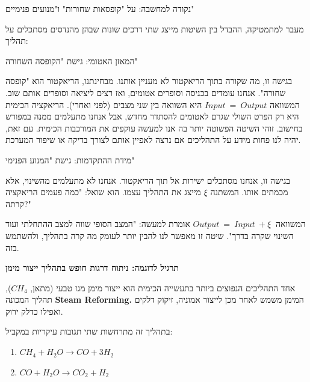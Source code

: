 \documentclass[
  hebrew,
  letterpaper,
  DIV=11,
  numbers=noendperiod]{scrreprt}
\begin{document}
\begin{tcolorbox}[enhanced jigsaw, colback=white, arc=.35mm, coltitle=black, breakable, toptitle=1mm, leftrule=.75mm, colbacktitle=quarto-callout-tip-color!10!white, opacitybacktitle=0.6, bottomtitle=1mm, titlerule=0mm, opacityback=0, colframe=quarto-callout-tip-color-frame, title=\textcolor{quarto-callout-tip-color}{\faLightbulb}\hspace{0.5em}{עצה}, rightrule=.15mm, bottomrule=.15mm, toprule=.15mm, left=2mm]

נקודה למחשבה: על "קופסאות שחורות" ו"מנועים פנימיים"

מעבר למתמטיקה, ההבדל בין השיטות מייצג שתי דרכים שונות שבהן מהנדסים
מסתכלים על תהליך:

המאזן האטומי: גישת "הקופסה השחורה"

בגישה זו, מה שקורה בתוך הריאקטור לא מעניין אותנו. מבחינתנו, הריאקטור הוא
"קופסה שחורה". אנחנו עומדים בכניסה וסופרים אטומים, ואז רצים ליציאה
וסופרים אותם שוב. המשוואה \(Input\  = \ Output\) היא השוואה בין שני
מצבים (לפני ואחרי). הריאקציה הכימית היא רק הפרט השולי שגרם לאטומים
להסתדר מחדש, אבל אנחנו מתעלמים ממנה במפורש בחישוב. זוהי השיטה הפשוטה
יותר בה אנו למעשה עוקפים את המורכבות הכימית. עם זאת, יהיה לנו פחות מידע
על התהליכים אם נרצה לאפיין אותם לצורך בדיקה או שיפור המערכת.

מידת ההתקדמות: גישת "המנוע הפנימי"

בגישה זו, אנחנו מסתכלים ישירות אל תוך הריאקטור. אנחנו לא מתעלמים
מהשינוי, אלא מכמתים אותו. המשתנה \(\xi\) מייצג את התהליך עצמו. הוא שואל:
"כמה פעמים הריאקציה קרתה?"

המשוואה \(Output\  = \ Input\  + \xi\ \) אומרת למעשה: "המצב הסופי שווה
למצב ההתחלתי ועוד השינוי שקרה בדרך". שיטה זו מאפשר לנו להבין יותר לעומק
מה קרה בתהליך, ולהשתמש בזה.

\end{tcolorbox}

\textbf{תרגיל לדוגמה: ניתוח דרגות חופש בתהליך ייצור מימן}

אחד התהליכים הנפוצים ביותר בתעשייה הכימית הוא ייצור מימן מגז טבעי (מתאן,
\(CH_{4}\)), תהליך המכונה \textbf{Steam Reforming.} המימן משמש לאחר מכן
לייצור אמוניה, זיקוק דלקים ואפילו כדלק ירוק.

בתהליך זה מתרחשות שתי תגובות עיקריות במקביל:

\begin{enumerate}
\def\labelenumi{\arabic{enumi}.}
\item
  \(CH_{4} + H_{2}O \rightarrow CO + 3H_{2}\)
\item
  \(CO + H_{2}O \rightarrow CO_{2} + H_{2}\)
\end{enumerate}
\end{document}
